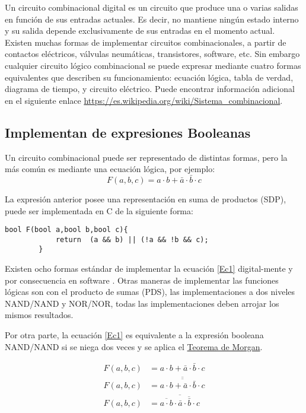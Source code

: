 Un circuito combinacional digital es un circuito que produce una o varias salidas en función de sus entradas actuales. Es decir, no mantiene ningún estado interno y su salida depende exclusivamente de sus entradas en el momento actual.
Existen muchas formas de implementar circuitos combinacionales, a partir de contactos eléctricos, válvulas neumáticas, transistores, software, etc. Sin embargo cualquier circuito lógico combinacional se puede expresar mediante cuatro formas equivalentes que describen su funcionamiento: ecuación lógica, tabla de verdad, diagrama de tiempo, y circuito eléctrico. 
Puede encontrar información adicional en el siguiente enlace \href{https://es.wikipedia.org/wiki/Sistema_combinacional}{https://es.wikipedia.org/wiki/Sistema\_combinacional}.   

\subsection{Implementan de expresiones Booleanas }

Un circuito combinacional  puede ser representado de distintas formas, pero la más común es mediante una ecuación lógica, por ejemplo: 
\begin{equation}
\label{Ec1}
F(a,b,c)=a\cdot b+\bar{a}\cdot \bar{b}\cdot c
\end{equation}

La expresión anterior posee una representación en suma de productos (SDP), puede ser implementada en C de la siguiente forma:

		 \begin{lstlisting}[language=Arduino,numbers=none, showstringspaces=false]
		bool F(bool a,bool b,bool c){
			return  (a && b) || (!a && !b && c);
		}
		\end{lstlisting} 

Existen ocho formas estándar de implementar la ecuación \eqref{Ec1} digital-mente y por consecuencia en software . Otras maneras de implementar las funciones lógicas  son con el producto de sumas (PDS), las implementaciones a dos niveles  NAND/NAND y NOR/NOR, todas las implementaciones deben arrojar los mismos resultados.

Por otra parte, la ecuación \eqref{Ec1} es equivalente a la expresión booleana  NAND/NAND si se niega dos veces y se aplica el \href{https://es.wikipedia.org/wiki/Leyes_de_De_Morgan}{Teorema de Morgan}.


\begin{align}
\label{Ec2}
F(a,b,c)&=a\cdot b+\bar{a}\cdot \bar{b} \cdot c \\
F(a,b,c)&=\overline{\overline{a\cdot b+\bar{a}\cdot \bar{b}\cdot c}} \\  \label{Ec3}
F(a,b,c)&=\overline{\overline{a\cdot b}\cdot\overline{\bar{a}\cdot \bar{b}\cdot c}}
\end{align}


